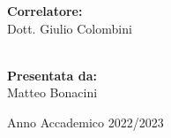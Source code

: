 {\begin{titlingpage}
\begin{minipage}[t]{0.47\textwidth}
{            \textbf{Correlatore:}
            \vspace{2mm}\\
            Dott. Giulio Colombini
            \\
            \\
        }
        \end{minipage}
%
        \hspace{25mm}
        \hfill
%
        \begin{minipage}[t]{0.47\textwidth}
                {
                    \LARGE
                    \textbf{Presentata da:}
                    \vspace{2mm}\\
                    Matteo Bonacini
                }
        \end{minipage}

        \vspace{40mm}

        \begin{center}
            Anno Accademico 2022/2023
        \end{center}

    \end{titlingpage}
}




